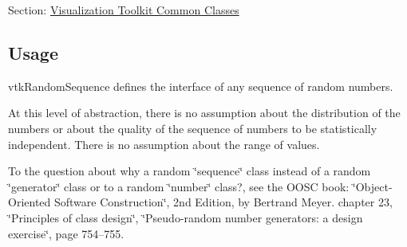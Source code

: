 Section\-: \hyperlink{sec_vtkcommon}{Visualization Toolkit Common Classes} \hypertarget{vtkwidgets_vtkxyplotwidget_Usage}{}\subsection{Usage}\label{vtkwidgets_vtkxyplotwidget_Usage}
vtk\-Random\-Sequence defines the interface of any sequence of random numbers.

At this level of abstraction, there is no assumption about the distribution of the numbers or about the quality of the sequence of numbers to be statistically independent. There is no assumption about the range of values.

To the question about why a random \char`\"{}sequence\char`\"{} class instead of a random \char`\"{}generator\char`\"{} class or to a random \char`\"{}number\char`\"{} class?, see the O\-O\-S\-C book\-: \char`\"{}\-Object-\/\-Oriented Software Construction\char`\"{}, 2nd Edition, by Bertrand Meyer. chapter 23, \char`\"{}\-Principles of class design\char`\"{}, \char`\"{}\-Pseudo-\/random number generators\-:
 a design exercise\char`\"{}, page 754--755.

